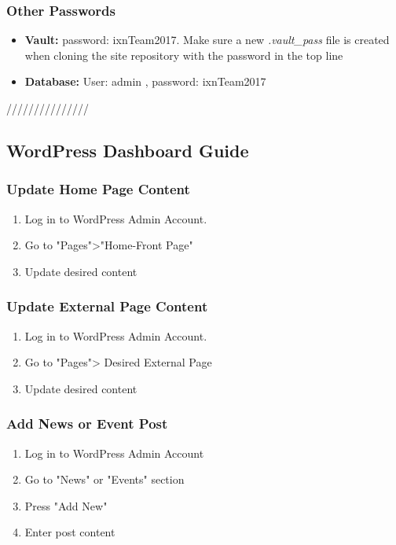 \subsubsection{Other Passwords}
\begin{itemize}

  \item \textbf{Vault:} password: ixnTeam2017. Make sure a new \textit{.vault\_pass} file is created when cloning the site repository with the password in the top line
  \item \textbf{Database:} User: admin , password: ixnTeam2017

\end{itemize}

///////////////

\subsection{WordPress Dashboard Guide}
\subsubsection{Update Home Page Content}

\begin{enumerate}

  \item Log in to WordPress Admin Account.
  \item Go to "Pages">"Home-Front Page"
  \item Update desired content

\end{enumerate}

\subsubsection{Update External Page Content}
\begin{enumerate}

  \item Log in to WordPress Admin Account.
  \item Go to "Pages"> Desired External Page
  \item Update desired content

\end{enumerate}

\subsubsection{Add News or Event Post}
\begin{enumerate}

  \item Log in to WordPress Admin Account
  \item Go to "News" or "Events" section
  \item Press "Add New"
  \item Enter post content

\end{enumerate}

